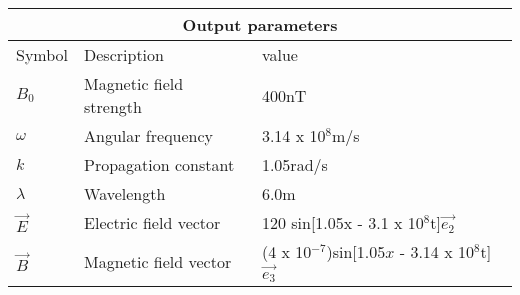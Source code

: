 \setlength{\arrayrulewidth}{0.3mm}
\setlength{\tabcolsep}{15pt}
\renewcommand{\arraystretch}{1.5}

\begin{center}
\begin{tabular}{ |p{1cm}|p{1cm}|p{4.5cm}|  }
\hline
\multicolumn{3}{|c|}{Output parameters} \\
\hline
Symbol& Description&value\\
\hline
$B_0$ & Magnetic field strength & 400nT\\
\hline
$\omega$ & Angular frequency & 3.14 x 10$^8$m/s\\
\hline
$k$ &Propagation constant & 1.05rad/s\\
\hline
$\lambda$ & Wavelength & 6.0m\\
\hline
$\vec{E}$ & Electric field vector & 120 sin[1.05x - 3.1 x 10$^8$t]$\vec{e_2}$\\
\hline
$\vec{B}$ & Magnetic field vector & (4 x 10$^{-7}$)sin[1.05$x$ - 3.14 x 10$^8$t]$\vec{e_3}$\\
\hline
\end{tabular}
\end{center}